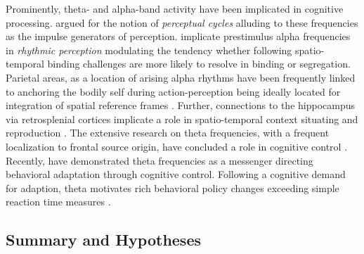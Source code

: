 Prominently, theta- and alpha-band activity have been implicated in cognitive processing. \citet{VanRullen2016} argued for the notion of \textit{perceptual cycles} alluding to these frequencies as the impulse generators of perception. \citet{Rohe2019} implicate prestimulus alpha frequencies in \textit{rhythmic perception} modulating the tendency whether following spatio-temporal binding challenges are more likely to resolve in binding or segregation. Parietal areas, as a location of arising alpha rhythms have been frequently linked to anchoring the bodily self during action-perception being ideally located for integration of spatial reference frames \cite{Blanke2015, Guterstam2015a, Halgren2019}. Further, connections to the hippocampus via retrosplenial cortices implicate a role in spatio-temporal context situating and reproduction \cite{Pearson2011, Clark2018, Gramann2009, Friston2016a}. The extensive research on theta frequencies, with a frequent localization to frontal source origin, have concluded a role in cognitive control \cite{Cavanagh2014}. Recently, \citet{Duprez2020} have demonstrated theta frequencies as a messenger directing behavioral adaptation through cognitive control. Following a cognitive demand for adaption, theta motivates rich behavioral policy changes exceeding simple reaction time measures \cite{Cooper2019}.



\subsection{Summary and Hypotheses} %





























